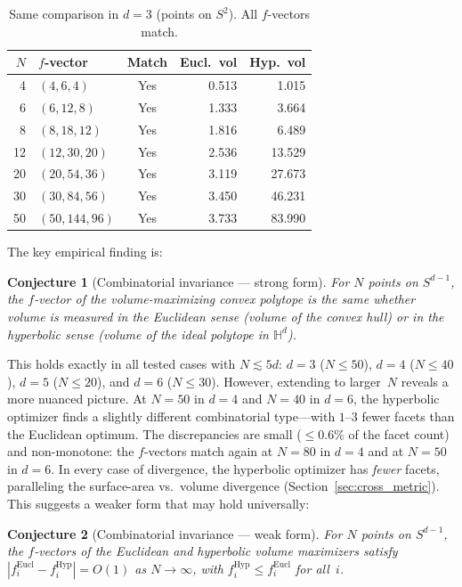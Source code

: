 \documentclass[11pt]{article}
\newtheorem{conjecture}{Conjecture}
\begin{document}
\begin{table}[ht]
\centering
\caption{Same comparison in $d=3$ (points on $S^2$). All $f$-vectors match.}
\label{tab:comb_d3}
\smallskip
\begin{tabular}{r l c r r}
\toprule
$N$ & $f$-vector & Match & Eucl.\ vol & Hyp.\ vol \\
\midrule
4  & $(4,6,4)$       & Yes & 0.513 & 1.015 \\
6  & $(6,12,8)$      & Yes & 1.333 & 3.664 \\
8  & $(8,18,12)$     & Yes & 1.816 & 6.489 \\
12 & $(12,30,20)$    & Yes & 2.536 & 13.529 \\
20 & $(20,54,36)$    & Yes & 3.119 & 27.673 \\
30 & $(30,84,56)$    & Yes & 3.450 & 46.231 \\
50 & $(50,144,96)$   & Yes & 3.733 & 83.990 \\
\bottomrule
\end{tabular}
\end{table}

The key empirical finding is:

\begin{conjecture}[Combinatorial invariance --- strong form]
\label{conj:comb_invariance}
For $N$ points on $S^{d-1}$, the $f$-vector of the volume-maximizing
convex polytope is the same whether volume is measured in the Euclidean
sense (volume of the convex hull) or in the hyperbolic sense (volume of the
ideal polytope in $\mathbb{H}^d$).
\end{conjecture}

This holds exactly in all tested cases with $N \lesssim 5d$:
$d=3$ ($N \leq 50$), $d=4$ ($N \leq 40$), $d=5$ ($N \leq 20$),
and $d=6$ ($N \leq 30$).
However, extending to larger~$N$ reveals a more nuanced picture.
At $N = 50$ in $d = 4$ and $N = 40$ in $d = 6$, the hyperbolic optimizer
finds a slightly different combinatorial type---with $1$--$3$ fewer facets
than the Euclidean optimum.  The discrepancies are small
($\leq 0.6\%$ of the facet count) and non-monotone: the $f$-vectors
match again at $N = 80$ in $d = 4$ and at $N = 50$ in $d = 6$.
In every case of divergence, the hyperbolic optimizer has \emph{fewer}
facets, paralleling the surface-area vs.\ volume divergence
(Section~\ref{sec:cross_metric}).
This suggests a weaker form that may hold universally:

\begin{conjecture}[Combinatorial invariance --- weak form]
\label{conj:comb_weak}
For $N$ points on $S^{d-1}$, the $f$-vectors of the Euclidean and
hyperbolic volume maximizers satisfy
$|f_i^{\mathrm{Eucl}} - f_i^{\mathrm{Hyp}}| = O(1)$
as $N \to \infty$, with $f_i^{\mathrm{Hyp}} \leq f_i^{\mathrm{Eucl}}$
for all~$i$.
\end{conjecture}
\end{document}
